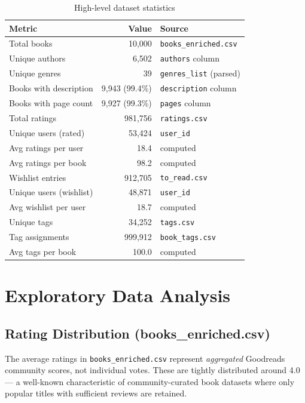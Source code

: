 \documentclass[12pt, a4paper]{article}
\newcommand{\code}[1]{\texttt{\small\color{shelfPurple}#1}}
\begin{document}
\begin{table}[H]
\centering
\caption{High-level dataset statistics}
\begin{tabular}{@{}lrl@{}}
\toprule
\textbf{Metric} & \textbf{Value} & \textbf{Source} \\
\midrule
Total books & 10{,}000 & \code{books\_enriched.csv} \\
Unique authors & 6{,}502 & \code{authors} column \\
Unique genres & 39 & \code{genres\_list} (parsed) \\
Books with description & 9{,}943 (99.4\%) & \code{description} column \\
Books with page count & 9{,}927 (99.3\%) & \code{pages} column \\
\midrule
Total ratings & 981{,}756 & \code{ratings.csv} \\
Unique users (rated) & 53{,}424 & \code{user\_id} \\
Avg ratings per user & 18.4 & computed \\
Avg ratings per book & 98.2 & computed \\
\midrule
Wishlist entries & 912{,}705 & \code{to\_read.csv} \\
Unique users (wishlist) & 48{,}871 & \code{user\_id} \\
Avg wishlist per user & 18.7 & computed \\
\midrule
Unique tags & 34{,}252 & \code{tags.csv} \\
Tag assignments & 999{,}912 & \code{book\_tags.csv} \\
Avg tags per book & 100.0 & computed \\
\bottomrule
\end{tabular}
\end{table}

\section{Exploratory Data Analysis}

\subsection{Rating Distribution (books\_enriched.csv)}

The average ratings in \code{books\_enriched.csv} represent \emph{aggregated}
Goodreads community scores, not individual votes. These are tightly distributed
around 4.0 --- a well-known characteristic of community-curated book datasets
where only popular titles with sufficient reviews are retained.
\end{document}
